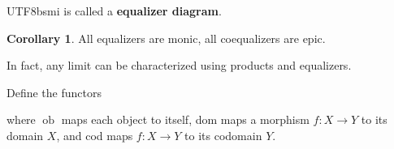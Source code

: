 \documentclass[12pt]{article}
\theoremstyle{definition}
\newtheorem{corollary}[definition]{Corollary}
\newcommand\<{\langle}
\renewcommand\>{\rangle}
\DeclareMathOperator{\ob}{ob}
\begin{document}
\begin{CJK}{UTF8}{bsmi}
is called a \textbf{equalizer diagram}.

\begin{corollary}
    All equalizers are monic, all coequalizers are epic.
\end{corollary}

In fact, any limit can be characterized using products and equalizers.

Define the functors 
\begin{center}
\end{center}
where $\ob$ maps each object to itself, dom maps a morphism $f:X\to Y$ to its domain $X$, and cod maps $f:X\to Y$ to its codomain $Y$.


\end{CJK}
\end{document}
